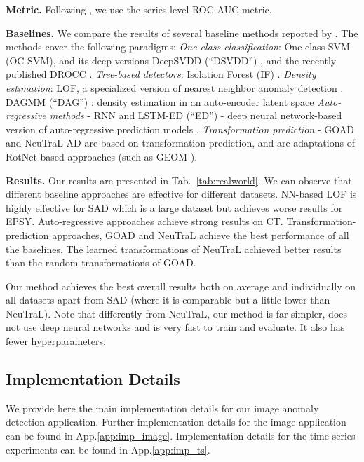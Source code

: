 \documentclass{article}
\begin{document}
\textbf{Metric.} Following \citet{qiu2021neural}, we use the series-level ROC-AUC metric.

\textbf{Baselines.} We compare the results of several baseline methods reported by \citet{qiu2021neural}. The methods cover the following paradigms: \textit{One-class classification}: One-class SVM (OC-SVM), and its deep versions DeepSVDD  (``DSVDD'') \cite{ruff2018deep}, and the recently published DROCC \cite{goyal2020drocc}. 
\textit{Tree-based detectors}: Isolation Forest (IF) \cite{liu2008isolation}. \textit{Density estimation}: LOF, a specialized version of nearest neighbor anomaly detection \cite{breunig2000lof}.  DAGMM (``DAG'') \cite{zong2018deep}: density estimation in an auto-encoder latent space \textit{Auto-regressive methods} - RNN and LSTM-ED (``ED'') - deep neural network-based version of auto-regressive prediction models \cite{malhotra2016lstm}. \textit{Transformation prediction} - GOAD \cite{bergman2020classification} and NeuTraL-AD \cite{qiu2021neural} are based on transformation prediction, and are adaptations of RotNet-based approaches (such as GEOM \cite{golan2018deep}). 



\textbf{Results.} Our results are presented in Tab.~\ref{tab:realworld}. We can observe that different baseline approaches are effective for different datasets. NN-based LOF is highly effective for SAD which is a large dataset but achieves worse results for EPSY. Auto-regressive approaches achieve strong results on CT. Transformation-prediction approaches, GOAD and NeuTraL achieve the best performance of all the baselines. The learned transformations of NeuTraL achieved better results than the random transformations of GOAD.

Our method achieves the best overall results both on average and individually on all datasets apart from SAD (where it is comparable but a little lower than NeuTraL). Note that differently from NeuTraL, our method is far simpler, does not use deep neural networks and is very fast to train and evaluate. It also has fewer hyperparameters.


\subsection{Implementation Details} 
\label{sec:implementation_details}

We provide here the main implementation details for our image anomaly detection application.
Further implementation details for the image application can be found in
App.\ref{app:imp_image}. Implementation details for the time series experiments can be found in App.\ref{app:imp_ts}.
\end{document}
